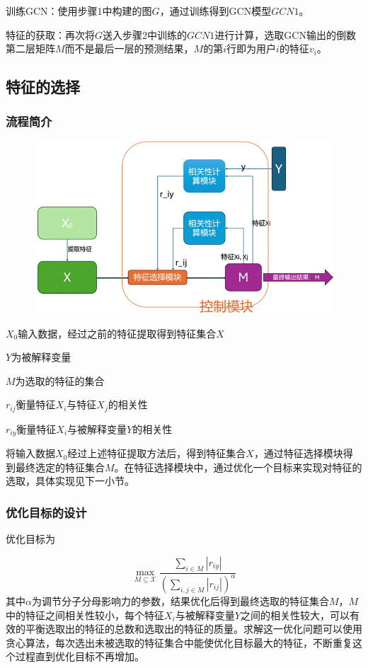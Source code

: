 \documentclass{article}
\begin{document}
训练GCN：使用步骤1中构建的图$G$，通过训练得到GCN模型$GCN1$。

特征的获取：再次将$G$送入步骤2中训练的$GCN1$进行计算，选取GCN输出的倒数第二层矩阵$M$而不是最后一层的预测结果，$M$的第$i$行即为用户$i$的特征$v_i$。


\subsection{特征的选择}

\subsubsection{流程简介}
\begin{figure}[htb]
	\centering
	\includegraphics[width=\linewidth]{屏幕截图 2025-01-13 095041.png}
\end{figure}


$X_0$输入数据，经过之前的特征提取得到特征集合$X$

$Y$为被解释变量

$M$为选取的特征的集合

$r_{ij}$衡量特征$X_i$与特征$X_j$的相关性

$r_{iy}$衡量特征$X_i$与被解释变量$Y$的相关性

将输入数据$X_0$经过上述特征提取方法后，得到特征集合$X$，通过特征选择模块得到最终选定的特征集合$M$。在特征选择模块中，通过优化一个目标来实现对特征的选取，具体实现见下一小节。

\subsubsection{优化目标的设计}

优化目标为

\[
\max_{M \subseteq \mathcal{X}} \frac{\sum_{i \in M} |r_{iy}|}{\left(\sum_{i, j \in M} |r_{ij}|\right)^\alpha}
\]
其中$\alpha$为调节分子分母影响力的参数，结果优化后得到最终选取的特征集合$M$，$M$中的特征之间相关性较小，每个特征$X_i$与被解释变量$Y$之间的相关性较大，可以有效的平衡选取出的特征的总数和选取出的特征的质量。求解这一优化问题可以使用贪心算法，每次选出未被选取的特征集合中能使优化目标最大的特征，不断重复这个过程直到优化目标不再增加。
\end{document}
